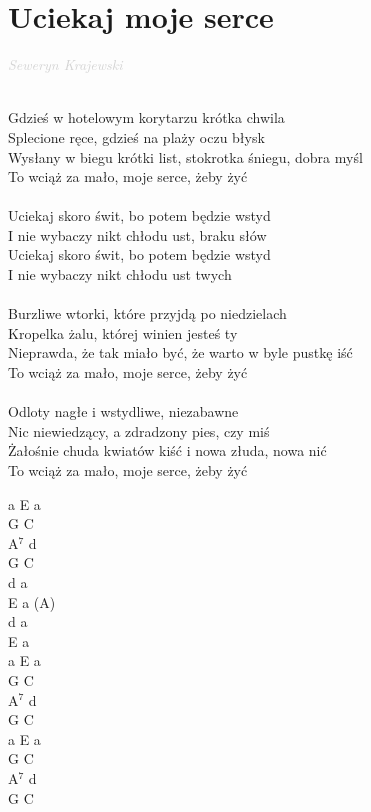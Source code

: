 \documentclass[a5paper, 10pt]{book}
\begin{document}
\newpage
\section{Uciekaj moje serce}\textcolor{lightgray}{\textit{Seweryn Krajewski
}}\\~\\
\begin{minipage}[t]{0.8\textwidth}
Gdzieś w hotelowym korytarzu krótka chwila\\
Splecione ręce, gdzieś na plaży oczu błysk\\
Wysłany w biegu krótki list, stokrotka śniegu, dobra myśl\\
To wciąż za mało, moje serce, żeby żyć\\
\\
\hspace*{5mm}Uciekaj skoro świt, bo potem będzie wstyd\\
\hspace*{5mm}I nie wybaczy nikt chłodu ust, braku słów \\
\hspace*{5mm}Uciekaj skoro świt, bo potem będzie wstyd\\
\hspace*{5mm}I nie wybaczy nikt chłodu ust twych\\
\\
Burzliwe wtorki, które przyjdą po niedzielach\\
Kropelka żalu, której winien jesteś ty\\
Nieprawda, że tak miało być, że warto w byle pustkę iść\\
To wciąż za mało, moje serce, żeby żyć\\
\\
Odloty nagłe i wstydliwe, niezabawne\\
Nic niewiedzący, a zdradzony pies, czy miś\\
Żałośnie chuda kwiatów kiść i nowa złuda, nowa nić\\
To wciąż za mało, moje serce, żeby żyć\\
\end{minipage}
\begin{minipage}[t]{0.2\textwidth}
a E a\\
G C\\
A$^7$ d\\
G C\\

d a\\
E a (A)\\
d a\\
E a\\

a E a\\
G C\\
A$^7$ d\\
G C\\

a E a\\
G C\\
A$^7$ d\\
G C\\
\end{minipage}
\end{document}
